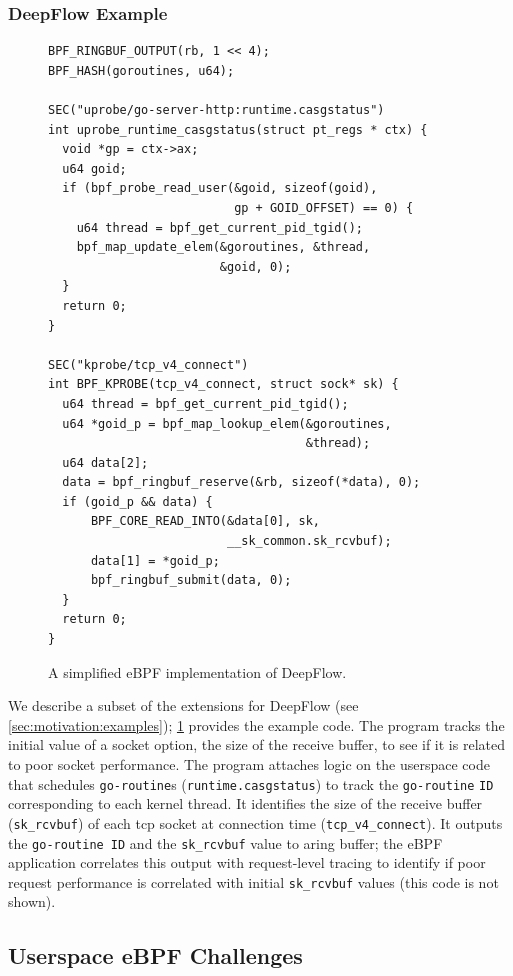\subsubsection{DeepFlow Example}
\begin{figure}[t]
\centering
\begin{verbatim}
BPF_RINGBUF_OUTPUT(rb, 1 << 4);
BPF_HASH(goroutines, u64);

SEC("uprobe/go-server-http:runtime.casgstatus")
int uprobe_runtime_casgstatus(struct pt_regs * ctx) {
  void *gp = ctx->ax;
  u64 goid;
  if (bpf_probe_read_user(&goid, sizeof(goid),
                          gp + GOID_OFFSET) == 0) {
    u64 thread = bpf_get_current_pid_tgid();
    bpf_map_update_elem(&goroutines, &thread, 
                        &goid, 0);
  }
  return 0;
}

SEC("kprobe/tcp_v4_connect")
int BPF_KPROBE(tcp_v4_connect, struct sock* sk) {
  u64 thread = bpf_get_current_pid_tgid();
  u64 *goid_p = bpf_map_lookup_elem(&goroutines, 
                                    &thread);
  u64 data[2];
  data = bpf_ringbuf_reserve(&rb, sizeof(*data), 0);
  if (goid_p && data) {
      BPF_CORE_READ_INTO(&data[0], sk, 
                         __sk_common.sk_rcvbuf);
      data[1] = *goid_p;
      bpf_ringbuf_submit(data, 0);
  }
  return 0;
}
\end{verbatim}
\vspace{-0.5cm}
\caption{A simplified eBPF implementation of DeepFlow. 
\label{code:example}}
\vspace{-0.5cm}
\end{figure}
We describe a subset of the extensions for DeepFlow (see \cref{sec:motivation:examples}); \cref{code:example} provides the example code.  The program tracks the initial value of a socket option, the size of the receive buffer, to see if it is related to poor socket performance.  The program attaches logic on the userspace code that schedules \texttt{go-routine}s (\texttt{runtime.casgstatus}) to track the \texttt{go-routine} \texttt{ID} corresponding to each kernel thread.  It identifies the size of the receive buffer (\texttt{sk\_rcvbuf}) of each tcp socket at connection time (\texttt{tcp_v4_connect}).  It  outputs the \texttt{go-routine ID} and the \texttt{sk\_rcvbuf} value to aring buffer; the eBPF application correlates this output with request-level tracing to identify if poor request performance is correlated with initial \texttt{sk\_rcvbuf} values (this code is not shown).


\subsection{Userspace eBPF Challenges} \label{sec:challenges:details}

